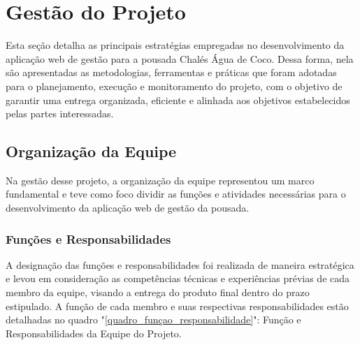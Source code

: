 \documentclass[
	12pt,				%
	openany,			%
	twoside,			%
	a4paper,			%
	english,			%
	french,				%
	spanish,			%
	brazil				%
	]{abntex2}
\begin{document}

\chapter{Gestão do Projeto}
Esta seção detalha as principais estratégias empregadas no desenvolvimento da aplicação web de gestão para a pousada Chalés Água de Coco. Dessa forma, nela são apresentadas as metodologias, ferramentas e práticas que foram adotadas para o planejamento, execução e monitoramento do projeto, com o objetivo de garantir uma entrega organizada, eficiente e alinhada aos objetivos estabelecidos pelas partes interessadas.
\section{Organização da Equipe}
  Na gestão desse projeto, a organização da equipe representou um marco fundamental e teve como foco dividir as funções e atividades necessárias para o desenvolvimento da aplicação web de gestão da pousada.
  
\subsection{Funções e Responsabilidades}
A designação das funções e responsabilidades foi realizada de maneira estratégica e levou em consideração as competências técnicas e experiências prévias de cada membro da equipe, visando a entrega do produto final dentro do prazo estipulado. 	A função de cada membro e suas respectivas responsabilidades estão detalhadas no quadro "\ref{quadro_funçao_responsabilidade}": Função e Responsabilidades da Equipe do Projeto.	
\end{document}
